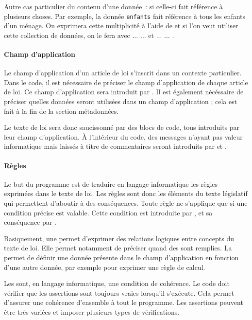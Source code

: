 
Autre cas particulier du contenu d’une donnée : si celle-ci fait référence à plusieurs choses. Par exemple, la donnée \texttt{enfants} fait référence à tous les enfants d’un ménage. On exprimera cette multiplicité à l’aide de  et si l’on veut utiliser cette collection de données, on le fera avec  $\ldots$  $\ldots$  et  $\ldots$  $\ldots$ .

\paragraph{Champ d’application} Le champ d’application d’un article de loi s’inscrit dans un contexte particulier. Dans le code, il est nécessaire de préciser le champ d’application de chaque article de loi. Ce champ d’application sera introduit par . Il est également nécéssaire de préciser quelles données seront utilisées dans un champ d'application ; cela est fait à la fin de la section métadonnées.

Le texte de loi sera donc saucissonné par des blocs de code, tous introduits par leur champ d'application. À l'intérieur du code, des messages n'ayant pas valeur informatique mais laissés à titre de commentaires seront introduits par \cm{\#} et .

\paragraph{Règles} Le but du programme est de traduire en langage informatique les règles exprimées dans le texte de loi. Les règles sont donc les éléments du texte législatif qui permettent d’aboutir à des conséquences. Toute règle ne s’applique que si une condition précise est valable. Cette condition est introduite par , et sa conséquence par .

Basiquement, une  permet d’exprimer des relations logiques entre concepts du texte de loi. Elle permet notamment de préciser quand des  sont remplies. La  permet de définir une donnée présente dans le champ d'application en fonction d’une autre donnée, par exemple pour exprimer une règle de calcul.

Les  sont, en langage informatique, une condition de cohérence. Le code doit vérifier que les assertions sont toujours vraies lorsqu’il s’exécute. Cela permet d’assurer une cohérence d’ensemble à tout le programme. Les assertions peuvent être très variées et imposer plusieurs types de vérifications.
